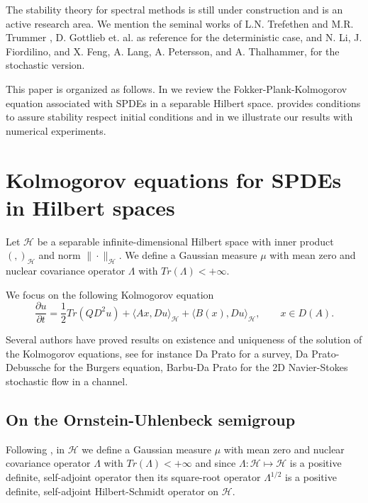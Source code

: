 \documentclass[]{interact}
\theoremstyle{plain}%
\theoremstyle{definition}
\theoremstyle{remark}
\begin{document}
        The stability theory for spectral methods is still under 
    construction and is an active research area. We mention the seminal works of
    L.N. Trefethen and M.R. Trummer \cite{Trefethen1987}, D. Gottlieb et. al.
    \cite{Gottlieb1987a} as reference for the deterministic case, and N. Li, J.
    Fiordilino, and X. Feng, \cite{Li2019} A. Lang, A. Petersson,  and A.
    Thalhammer, \cite{Lang2017} for the stochastic version.
    
        This paper is organized as follows. In  we review the
    Fokker-Plank-Kolmogorov equation associated with SPDEs in
    a separable Hilbert space.  
    provides conditions to assure stability respect initial conditions and in 
     we illustrate our
    results with numerical experiments.

\section{Kolmogorov equations for SPDEs in Hilbert spaces}
\label{fpk-sect}
        Let $\mathcal{H}$ be a separable infinite-dimensional Hilbert space with
    inner product $( ,  )_\mathcal{H} $ and norm $\|\cdot\|_\mathcal{H}$. We 
    define a Gaussian measure $\mu$ with mean zero and nuclear covariance 
    operator $\Lambda$ with  $Tr(\Lambda)<+\infty$.

    We focus on the following Kolmogorov equation
    \begin{equation}
        \label{P1s2.3}
        \frac{\partial u}{\partial t}
            = \frac{1}{2} Tr(QD^2u)
            + \langle Ax, Du
                \rangle_\mathcal{H} 
            + \langle B(x),Du \rangle_\mathcal{H},
            \qquad x\in D(A).
    \end{equation}

        Several authors have proved results on existence and uniqueness of the
    solution of the Kolmogorov equations, see for instance Da Prato \cite{da} 
    for a survey, Da Prato-Debussche \cite{da-de} for the Burgers equation,  
    Barbu-Da Prato \cite{ba-da} for the 2D Navier-Stokes stochastic flow in a 
    channel.
%
    \subsection{On the Ornstein-Uhlenbeck semigroup}
        \label{OUS-sect}
        Following \cite{liu},  in $\mathcal{H}$ we define a Gaussian measure 
        $\mu$ with mean zero and nuclear covariance operator $\Lambda$ with
        ${Tr(\Lambda)<+\infty}$ and since 
        $
            \Lambda:\mathcal{H}\mapsto \mathcal{H}
        $ 
    is a positive definite, self-adjoint operator then its square-root operator
    $\Lambda^{1/2}$ is a positive definite, self-adjoint Hilbert-Schmidt 
    operator on $\mathcal{H}$.
\end{document}
